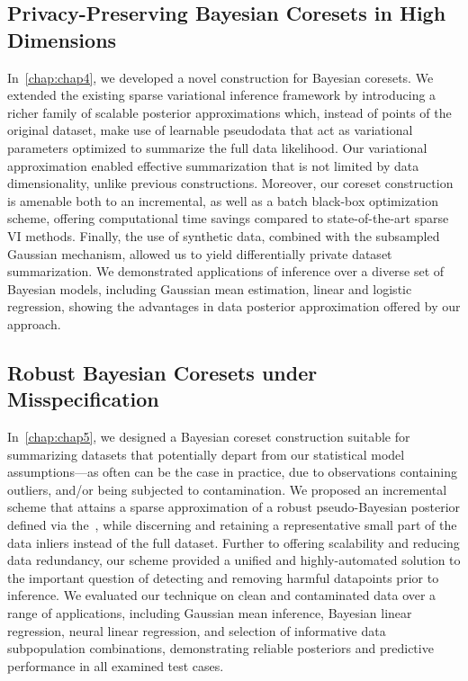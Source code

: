 \subsection{Privacy-Preserving Bayesian Coresets in High Dimensions}
\label{subsec:ch4-summary}
In~\cref{chap:chap4}, we developed a novel construction for Bayesian coresets. We extended the existing sparse variational inference framework by introducing a richer family of scalable posterior approximations which, instead of points of the original dataset, make use of learnable pseudodata that act as variational parameters optimized to summarize the full data likelihood. Our variational approximation enabled effective summarization that is not limited by data dimensionality, unlike previous constructions. Moreover, our coreset construction is amenable both to an incremental, as well as a batch black-box optimization scheme, offering computational time savings compared to state-of-the-art sparse VI methods. Finally, the use of synthetic data, combined with the subsampled Gaussian mechanism, allowed us to yield differentially private dataset summarization. We demonstrated applications of inference over a diverse set of Bayesian models, including Gaussian mean estimation, linear and logistic regression, showing the advantages in data posterior approximation offered by our approach.

\subsection{Robust Bayesian Coresets under Misspecification}
\label{subsec:ch4-summary}
In~\cref{chap:chap5}, we designed a Bayesian coreset construction suitable for summarizing datasets that potentially depart from our statistical model assumptions---as often can be the case in practice, due to observations containing outliers, and/or being subjected to contamination. We proposed an incremental scheme that attains a sparse approximation of a robust pseudo-Bayesian posterior defined via the~\bdiv, while discerning and retaining a representative small part of the data inliers instead of the full dataset. Further to offering scalability and reducing data redundancy, our scheme provided a unified and highly-automated solution to the important question of detecting and removing harmful datapoints prior to inference. We evaluated our technique on clean and contaminated data over a range of applications, including Gaussian mean inference, Bayesian linear regression, neural linear regression, and selection of informative data subpopulation combinations, demonstrating reliable posteriors and predictive performance in all examined test cases.


